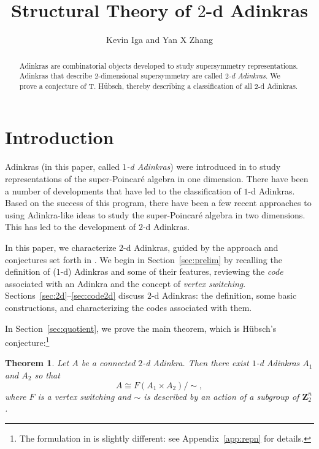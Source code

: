 \documentclass[12pt,twoside,singlespace]{article}
\title{Structural Theory of $2$-d Adinkras}
\author{Kevin Iga and Yan X Zhang}
\numberwithin{equation}{section}
\newtheorem{thm}[equation]{Theorem}
\theoremstyle{definition}
\newcommand{\ZZ}{\mathbf{Z}}
\begin{document}
\pagestyle{plain}

\maketitle

\begin{abstract}
Adinkras are combinatorial objects developed to study supersymmetry representations.  Adinkras that describe $2$-dimensional supersymmetry are called \emph{$2$-d Adinkras}.  We prove a conjecture of T. H\"ubsch, thereby describing a classification of all $2$-d Adinkras.
\end{abstract}


\section{Introduction}
Adinkras (in this paper, called \emph{$1$-d Adinkras}) were introduced in \cite{d2l:first} to study representations of the super-Poincar\'e algebra in one dimension.  There have been a number of developments that have led to the classification of $1$-d Adinkras.\cite{d2l:decodes,d2l:topology, d2l:graph-theoretic,dil:cohomology,d2l:omni,zhang:adinkras}  Based on the success of this program, there have been a few recent approaches to using Adinkra-like ideas to study the super-Poincar\'e algebra in two dimensions.  This has led to the development of $2$-d Adinkras.\cite{gates:dimensional_extension,hubsch:weaving}

In this paper, we characterize $2$-d Adinkras, guided by the approach and conjectures set forth in \cite{hubsch:weaving}. We begin in Section~\ref{sec:prelim} by recalling the definition of ($1$-d) Adinkras and some of their features, reviewing the \emph{code} associated with an Adinkra\cite{d2l:omni} and the concept of \emph{vertex switching}.\cite{dil:cohomology,zhang:adinkras}  Sections~\ref{sec:2d}--\ref{sec:code2d} discuss $2$-d Adinkras: the definition, some basic constructions, and characterizing the codes associated with them.

In Section~\ref{sec:quotient}, we prove the main theorem, which is H\"ubsch's conjecture:\footnote{The formulation in \cite{hubsch:weaving} is slightly different: see Appendix~\ref{app:repn} for details.}

\begin{thm}
\label{thm:main}
Let $A$ be a connected $2$-d Adinkra.  Then there exist $1$-d Adinkras $A_1$ and $A_2$ so that
\[A\cong F(A_1\times A_2)/\sim, \]
where $F$ is a vertex switching and  $\sim$ is described by an action of a subgroup of $\ZZ_2^n$.
\end{thm}
\end{document}

